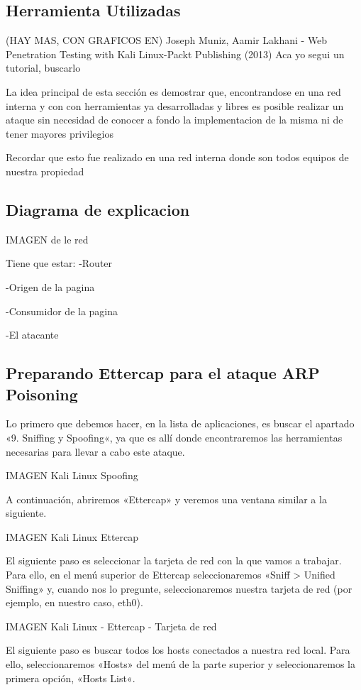 
\subsection{Herramienta Utilizadas} 


(HAY MAS, CON GRAFICOS EN)
Joseph Muniz, Aamir Lakhani - Web Penetration Testing with Kali Linux-Packt Publishing (2013)
Aca yo segui un tutorial, buscarlo

La idea principal de esta sección es demostrar que, encontrandose en una red interna
y con con herramientas ya desarrolladas y libres es posible realizar un ataque 
sin necesidad de conocer a fondo la implementacion de la misma ni de tener mayores
privilegios

Recordar que esto fue realizado en una red interna donde son todos equipos de nuestra propiedad

\subsection{Diagrama de explicacion}
IMAGEN de le red

Tiene que estar:
-Router

-Origen de la pagina

-Consumidor de la pagina

-El atacante

\subsection{Preparando Ettercap para el ataque ARP Poisoning}

Lo primero que debemos hacer, en la lista de aplicaciones, es buscar el apartado 
«9. Sniffing y Spoofing«, ya que es allí donde encontraremos las herramientas necesarias
 para llevar a cabo este ataque.

IMAGEN Kali Linux Spoofing

A continuación, abriremos «Ettercap» y veremos una ventana similar a la siguiente.

IMAGEN  Kali Linux Ettercap

El siguiente paso es seleccionar la tarjeta de red con la que vamos a trabajar. Para ello, en el menú superior de Ettercap seleccionaremos «Sniff > Unified Sniffing» y, cuando nos lo pregunte, seleccionaremos nuestra tarjeta de red (por ejemplo, en nuestro caso, eth0).

IMAGEN Kali Linux - Ettercap - Tarjeta de red

El siguiente paso es buscar todos los hosts conectados a nuestra red local. Para ello, seleccionaremos «Hosts» del menú de la parte superior y seleccionaremos la primera opción, «Hosts List«.

